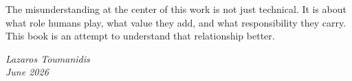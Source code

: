 The misunderstanding at the center of this work is not just technical. It is about what role humans play, what value they add, and what responsibility they carry. This book is an attempt to understand that relationship better.

\bigskip
\begin{flushright}
\textit{Lazaros Toumanidis}\\
\textit{June 2026}
\end{flushright}

